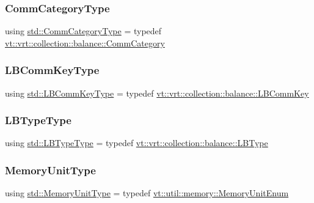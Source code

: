 \subsubsection{\texorpdfstring{Comm\+Category\+Type}{CommCategoryType}}
{\footnotesize\ttfamily using \hyperlink{namespacevt_1_1vrt_1_1collection_1_1balance_a9cc6c6884ca0416dae824e9204093c57}{std\+::\+Comm\+Category\+Type} = typedef \hyperlink{namespacevt_1_1vrt_1_1collection_1_1balance_a9cc6c6884ca0416dae824e9204093c57}{vt\+::vrt\+::collection\+::balance\+::\+Comm\+Category}}

\mbox{\label{namespacestd_a3a6802ab62d3595b44a8463f8e654c31}} 
\subsubsection{\texorpdfstring{L\+B\+Comm\+Key\+Type}{LBCommKeyType}}
{\footnotesize\ttfamily using \hyperlink{namespacestd_a3a6802ab62d3595b44a8463f8e654c31}{std\+::\+L\+B\+Comm\+Key\+Type} = typedef \hyperlink{structvt_1_1vrt_1_1collection_1_1balance_1_1_l_b_comm_key}{vt\+::vrt\+::collection\+::balance\+::\+L\+B\+Comm\+Key}}

\mbox{\label{namespacestd_ae3c14c256fabd8bbed83c439b367c3d8}} 
\subsubsection{\texorpdfstring{L\+B\+Type\+Type}{LBTypeType}}
{\footnotesize\ttfamily using \hyperlink{namespacevt_1_1vrt_1_1collection_1_1balance_ac4f99693509affcc67db182d4aad9b5c}{std\+::\+L\+B\+Type\+Type} = typedef \hyperlink{namespacevt_1_1vrt_1_1collection_1_1balance_ac4f99693509affcc67db182d4aad9b5c}{vt\+::vrt\+::collection\+::balance\+::\+L\+B\+Type}}

\mbox{\label{namespacestd_ad7105ed4fa94bea7fce7b09cea2c7165}} 
\subsubsection{\texorpdfstring{Memory\+Unit\+Type}{MemoryUnitType}}
{\footnotesize\ttfamily using \hyperlink{namespacevt_1_1util_1_1memory_a64df3d84293b34009f78e2a1db2f9bb6}{std\+::\+Memory\+Unit\+Type} = typedef \hyperlink{namespacevt_1_1util_1_1memory_a64df3d84293b34009f78e2a1db2f9bb6}{vt\+::util\+::memory\+::\+Memory\+Unit\+Enum}}

